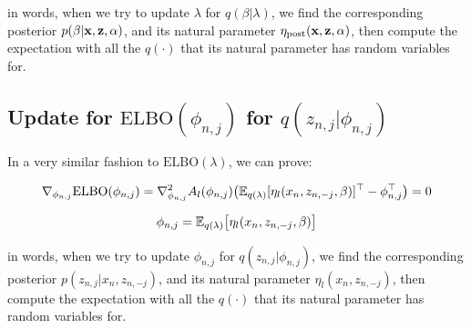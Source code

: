 \documentclass{article}
\def\DPhi{\nabla_{\phi_{n,j}}}
\def\post{\text{post}}
\begin{document}
in words, when we try to update $\lambda$ for $q(\beta | \lambda)$, we find the corresponding posterior $p (\beta | {\mathbf x}, {\mathbf z}, \alpha )$, and its natural parameter $\eta_\post (\x, \z,\alpha)$, then compute the expectation with all the $q(\cdot)$ that its natural parameter has random variables for.



\subsection{Update for $\text{ELBO}(\phi_{n,j})$ for $q(z_{n,j} | \phi_{n,j})$ \optional}

 

In a very similar fashion to $\text{ELBO}(\lambda)$, we can prove:

\begin{equation}\begin{split}
	\DPhi \text{ELBO}(\phi_{n,j}) &=  \nabla^2_{\phi_{n,j}} A_l(\phi_{n,j}) \big( \E_{q(\lambda)} [\eta_l (x_n, z_{n,-j},\beta)]^\top   - \phi_{n,j}^\top \big) = 0 \\
\end{split}\end{equation}



\begin{equation}\begin{split}
 \phi_{n,j} =  \mathbb{E}_{q(\lambda)} \big[\eta_l(x_n,z_{n,-j}, \beta)\big]
\end{split}\end{equation}

in words, when we try to update $ \phi_{n,j} $ for $q(z_{n,j} | \phi_{n,j})$, we find the corresponding posterior $p ( z_{n,j} | x_n, z_{n,-j} )$, and its natural parameter $\eta_l (x_n, z_{n,-j})$, then compute the expectation with all the $q(\cdot)$ that its natural parameter has random variables for.

\newpage




\end{document}
